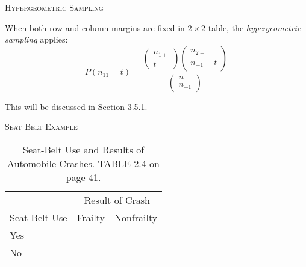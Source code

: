 \documentclass[dvipdfmx, serif,handout]{beamer}
\begin{document}
\begin{frame}{\textsc{Hypergeometric Sampling}}

	\bi
	\item When both row and column margins are fixed in $2\times 2$ table, the {\it hypergeometric sampling} applies:
	{\small
	$$P(n_{11}=t)=\frac{\left( \begin{array}{c} n_{1+} \\ t \end{array} \right)
			\left( \begin{array}{c} n_{2+} \\ n_{+1}-t \end{array} \right)}{\left( \begin{array}{c} n \\ n_{+1} \end{array} \right)}$$
	}
	\ei

	This will be discussed in Section 3.5.1.


\end{frame}
\begin{frame}{\textsc{Seat Belt Example}}

	{\footnotesize
		\begin{table}
			\begin{tabular}{lcc} \hline
				              & \multicolumn{2}{c}{Result of Crash}              \\ \cline{2-3}
				Seat-Belt Use & Frailty                             & Nonfrailty \\ \hline
				Yes                                                              \\
				No                                                               \\ \hline
			\end{tabular}
			\caption{\footnotesize Seat-Belt Use and Results of Automobile Crashes. TABLE 2.4 on page 41.}
		\end{table}
	}

\end{frame}
\end{document}
